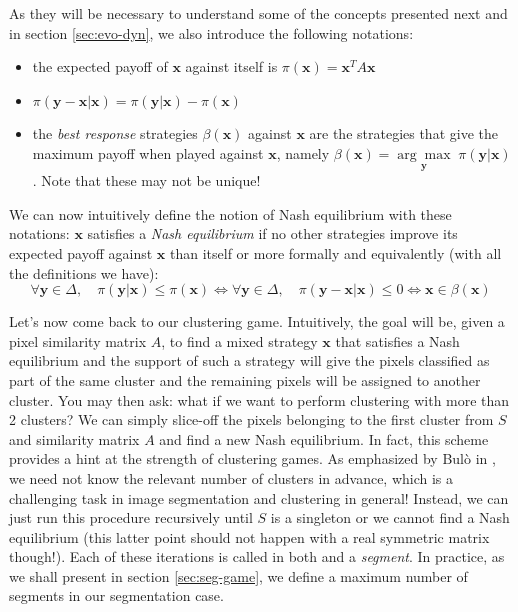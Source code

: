 \documentclass[11pt,a4paper]{article}
\begin{document}
As they will be necessary to understand some of the concepts presented next and in section \ref{sec:evo-dyn}, we also introduce the following notations:
\begin{itemize}
    \item the expected payoff of $\mathbf{x}$ against itself is $\pi(\mathbf{x})=\mathbf{x}^TA\mathbf{x}$
    \item $\pi(\mathbf{y}-\mathbf{x}|\mathbf{x}) = \pi(\mathbf{y}|\mathbf{x}) - \pi(\mathbf{x})$
    \item the \textit{best response} strategies $\beta(\mathbf{x})$ against $\mathbf{x}$ are the strategies that give the maximum payoff when played against $\mathbf{x}$, namely $\beta(\mathbf{x})=\underset{\mathbf{y}}{\arg\max}\;\pi(\mathbf{y}|\mathbf{x})$. Note that these may not be unique!
\end{itemize}

We can now intuitively define the notion of Nash equilibrium with these notations: $\mathbf{x}$ satisfies a \textit{Nash equilibrium} if no other strategies improve its expected payoff against $\mathbf{x}$ than itself or more formally and equivalently (with all the definitions we have):
\begin{equation}
    \forall \mathbf{y}\in\Delta,\quad  \pi(\mathbf{y}|\mathbf{x}) \leq \pi(\mathbf{x}) \iff \forall \mathbf{y}\in\Delta,\quad  \pi(\mathbf{y} - \mathbf{x}|\mathbf{x}) \leq 0 \iff \mathbf{x} \in \beta(\mathbf{x})
\end{equation}

Let's now come back to our clustering game. Intuitively, the goal will be, given a pixel similarity matrix $A$, to find a mixed strategy $\mathbf{x}$ that satisfies a Nash equilibrium and the support of such a strategy will give the pixels classified as part of the same cluster and the remaining pixels will be assigned to another cluster. You may then ask: what if we want to perform clustering with more than 2 clusters? We can simply slice-off the pixels belonging to the first cluster from $S$ and similarity matrix $A$ and find a new Nash equilibrium. In fact, this scheme provides a hint at the strength of clustering games. As emphasized by Bulò in \cite{bulo-thesis}, we need not know the relevant number of clusters in advance, which is a challenging task in image segmentation and clustering in general! Instead, we can just run this procedure recursively until $S$ is a singleton or we cannot find a Nash equilibrium (this latter point should not happen with a real symmetric matrix though!). Each of these iterations is called in both \cite{bulo-thesis} and \cite{game-clustering} a \textit{segment}. In practice, as we shall present in section \ref{sec:seg-game}, we define a maximum number of segments in our segmentation case.
\end{document}
